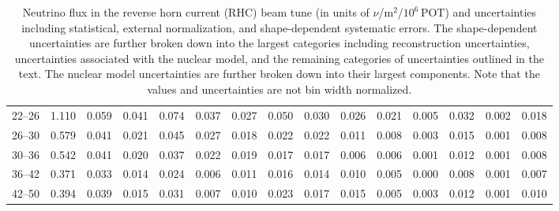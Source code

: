 \begin{turnpage}
\begin{table}[hpt]
\begin{tabular}{ccccc|cccc|cccccc}
 22--26 & 	 1.110 &  	 0.059 &  	 0.041 &  	 0.074 &  	 0.037 &  	 0.027 &  	 0.050 &  	 0.030 &  	 0.026 &  	 0.021 &  	 0.005 &  	 0.032 &  	 0.002 &  	 0.018 \\ 
 26--30 & 	 0.579 &  	 0.041 &  	 0.021 &  	 0.045 &  	 0.027 &  	 0.018 &  	 0.022 &  	 0.022 &  	 0.011 &  	 0.008 &  	 0.003 &  	 0.015 &  	 0.001 &  	 0.008 \\ 
 30--36 & 	 0.542 &  	 0.041 &  	 0.020 &  	 0.037 &  	 0.022 &  	 0.019 &  	 0.017 &  	 0.017 &  	 0.006 &  	 0.006 &  	 0.001 &  	 0.012 &  	 0.001 &  	 0.008 \\ 
 36--42 & 	 0.371 &  	 0.033 &  	 0.014 &  	 0.024 &  	 0.006 &  	 0.011 &  	 0.016 &  	 0.014 &  	 0.010 &  	 0.005 &  	 0.000 &  	 0.008 &  	 0.001 &  	 0.007 \\ 
 42--50 & 	 0.394 &  	 0.039 &  	 0.015 &  	 0.031 &  	 0.007 &  	 0.010 &  	 0.023 &  	 0.017 &  	 0.015 &  	 0.005 &  	 0.003 &  	 0.012 &  	 0.001 &  	 0.010 \\ 
  \hline
 \end{tabular}
\caption{Neutrino flux in the reverse horn current (RHC) beam tune (in units of $\nu$/m$^2$/$10^6$\,POT) and uncertainties including statistical, external normalization, and shape-dependent systematic errors. The shape-dependent uncertainties are further broken down into the largest categories including reconstruction uncertainties, uncertainties associated with the nuclear model, and the remaining categories of uncertainties outlined in the text. The nuclear model uncertainties are further broken down into their largest components. Note that the values and uncertainties are not bin width normalized.}
    \label{tbl:RHC-nu-flux}
\end{table}


\end{turnpage}
